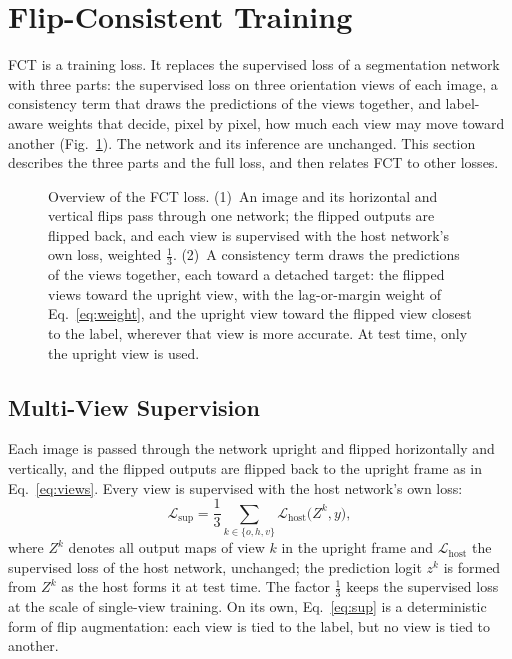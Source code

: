 \section{Flip-Consistent Training}
\label{sec:method}

FCT is a training loss. It replaces the supervised loss of a segmentation network with three parts:
the supervised loss on three orientation views of each image, a consistency term that draws the
predictions of the views together, and label-aware weights that decide, pixel by pixel, how much
each view may move toward another (Fig.~\ref{fig:overview}). The network and its inference are
unchanged. This section describes the three parts and the full loss, and then relates FCT to other
losses.

\begin{figure}[t]
\centering

\caption{Overview of the FCT loss. (1)~An image and its horizontal and vertical flips pass through one
network; the flipped outputs are flipped back, and each view is supervised with the host network's own
loss, weighted $\frac13$. (2)~A consistency term draws the predictions of the views together, each
toward a detached target: the flipped views toward the upright view, with the lag-or-margin weight of
Eq.~\eqref{eq:weight}, and the upright view toward the flipped view closest to the label, wherever that
view is more accurate. At test time, only the upright view is used.}
\label{fig:overview}
\end{figure}

\subsection{Multi-View Supervision}
\label{sec:views}

Each image is passed through the network upright and flipped horizontally and vertically, and the
flipped outputs are flipped back to the upright frame as in Eq.~\eqref{eq:views}. Every view is
supervised with the host network's own loss:
\begin{equation}
\mathcal{L}_{\mathrm{sup}}=\frac13\sum_{k\in\{o,h,v\}}\mathcal{L}_{\mathrm{host}}\big(Z^{k},y\big),
\label{eq:sup}
\end{equation}
where $Z^{k}$ denotes all output maps of view $k$ in the upright frame and $\mathcal{L}_{\mathrm{host}}$
the supervised loss of the host network, unchanged; the prediction logit $z^{k}$ is formed from $Z^{k}$
as the host forms it at test time. The factor $\frac13$ keeps the supervised loss at the scale of
single-view training. On its own, Eq.~\eqref{eq:sup} is a deterministic form of flip augmentation:
each view is tied to the label, but no view is tied to another.

